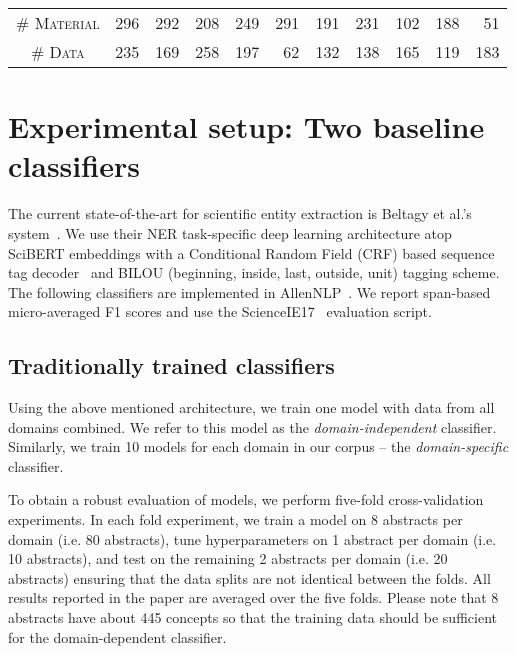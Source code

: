 \documentclass[runningheads]{llncs}
\begin{document}
\begin{table*}[htb]
\begin{tabular}{c|rrrrrrrrrr}
\# \textsc{Material} & 296                           & 292                           & 208                           & 249                          & 291                           & 191                           & 231                          & 102                          & 188                           & 51                            \\
\# \textsc{Data}   & 235                           & 169                           & 258                           & 197                          & 62                            & 132                           & 138                          & 165                          & 119                           & 183  
\end{tabular}
\label{table:1}
\end{table*}



\section{Experimental setup: Two baseline classifiers}
\label{sec:benchmark}

The current state-of-the-art 
for scientific entity extraction is Beltagy et al.'s system~\cite{Beltagy2019SciBERTPC}. We use their NER task-specific deep learning architecture atop SciBERT embeddings with a Conditional Random Field (CRF) based sequence tag decoder~\cite{Ma2016EndtoendSL} and BILOU (beginning, inside, last, outside, unit) tagging scheme.
The following classifiers are implemented in AllenNLP~\cite{gardner2018allennlp}. 
We report span-based micro-averaged F1 scores and use the ScienceIE17~\cite{augenstein2017semeval} evaluation script.

\subsection{Traditionally trained classifiers}

Using the above mentioned architecture, we train one model with data from all domains combined. We refer to this model as the \textit{domain-independent} classifier. Similarly, we train 10 models for each domain in our corpus -- the \textit{domain-specific} classifier.

To obtain a robust evaluation of models, we perform five-fold cross-validation experiments. In each fold experiment, we train a model on 8 abstracts per domain (i.e. 80 abstracts), tune hyperparameters on 1 abstract per domain (i.e. 10 abstracts), and test on the remaining 2 abstracts per domain (i.e. 20 abstracts) ensuring that the data splits are not identical between the folds. 
All results reported in the paper are averaged over the five folds. Please note that 8 abstracts have about 445 concepts so that the training data should be sufficient for the domain-dependent classifier.
\end{document}
